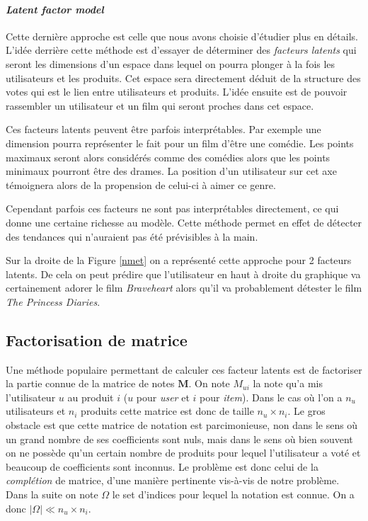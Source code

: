 \documentclass[10pt,a4paper]{article}
\begin{document}
\paragraph{\textit{Latent factor model}}

Cette dernière approche est celle que nous avons choisie d'étudier plus en détails. L'idée derrière cette méthode est d'essayer de déterminer des \textit{facteurs latents} qui seront les dimensions d'un espace dans lequel on pourra plonger à la fois les utilisateurs et les produits. Cet espace sera directement déduit de la structure des votes qui est le lien entre utilisateurs et produits. L'idée ensuite est de pouvoir rassembler un utilisateur et un film qui seront proches dans cet espace. 

Ces facteurs latents peuvent être parfois interprétables. Par exemple une dimension pourra représenter le fait pour un film d'être une comédie. Les points maximaux seront alors considérés comme des comédies alors que les points minimaux pourront être des drames. La position d'un utilisateur sur cet axe témoignera alors de la propension de celui-ci à aimer ce genre. 

Cependant parfois ces facteurs ne sont pas interprétables directement, ce qui donne une certaine richesse au modèle. Cette méthode permet en effet de détecter des tendances qui n'auraient pas été prévisibles à la main.

Sur la droite de la Figure \ref{nmet} on a représenté cette approche pour 2 facteurs latents. De cela on peut prédire que l'utilisateur en haut à droite du graphique va certainement adorer le film \textit{Braveheart} alors qu'il va probablement détester le film \textit{The Princess Diaries}.

\subsection{Factorisation de matrice}

Une méthode populaire permettant de calculer ces facteur latents est de factoriser la partie connue de la matrice de notes $\textbf{M}$. On note $M_{ui}$ la note qu'a mis l'utilisateur $u$ au produit $i$ ($u$ pour \textit{user} et $i$ pour \textit{item}). Dans le cas où l'on a $n_u$ utilisateurs et $n_i$ produits cette matrice est donc de taille $n_u\times n_i$. Le gros obstacle est que cette matrice de notation est parcimonieuse, non dans le sens où un grand nombre de ses coefficients sont nuls, mais dans le sens où bien souvent on ne possède qu'un certain nombre de produits pour lequel l'utilisateur a voté et beaucoup de coefficients sont inconnus. Le problème est donc celui de la \emph{complétion} de matrice, d'une manière pertinente vis-à-vis de notre problème. Dans la suite on note $\Omega$ le set d'indices pour lequel la notation est connue. On a donc $|\Omega|\ll n_u\times n_i$. 
\end{document}
